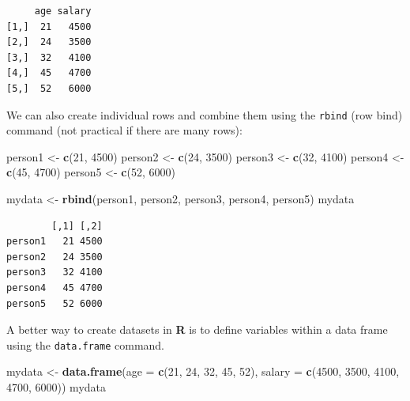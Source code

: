 \documentclass[]{book}
\newenvironment{Shaded}{\begin{snugshade}}{\end{snugshade}}
\newcommand{\DataTypeTok}[1]{\textcolor[rgb]{0.13,0.29,0.53}{#1}}
\newcommand{\DecValTok}[1]{\textcolor[rgb]{0.00,0.00,0.81}{#1}}
\newcommand{\KeywordTok}[1]{\textcolor[rgb]{0.13,0.29,0.53}{\textbf{#1}}}
\newcommand{\NormalTok}[1]{#1}
\newcommand{\StringTok}[1]{\textcolor[rgb]{0.31,0.60,0.02}{#1}}
\begin{document}
\begin{verbatim}
     age salary
[1,]  21   4500
[2,]  24   3500
[3,]  32   4100
[4,]  45   4700
[5,]  52   6000
\end{verbatim}

We can also create individual rows and combine them using the \texttt{rbind} (row bind) command (not practical if there are many rows):

\begin{Shaded}
\begin{Highlighting}[]
\NormalTok{person1 <-}\StringTok{ }\KeywordTok{c}\NormalTok{(}\DecValTok{21}\NormalTok{, }\DecValTok{4500}\NormalTok{)}
\NormalTok{person2 <-}\StringTok{ }\KeywordTok{c}\NormalTok{(}\DecValTok{24}\NormalTok{, }\DecValTok{3500}\NormalTok{)}
\NormalTok{person3 <-}\StringTok{ }\KeywordTok{c}\NormalTok{(}\DecValTok{32}\NormalTok{, }\DecValTok{4100}\NormalTok{)}
\NormalTok{person4 <-}\StringTok{ }\KeywordTok{c}\NormalTok{(}\DecValTok{45}\NormalTok{, }\DecValTok{4700}\NormalTok{)}
\NormalTok{person5 <-}\StringTok{ }\KeywordTok{c}\NormalTok{(}\DecValTok{52}\NormalTok{, }\DecValTok{6000}\NormalTok{)}

\NormalTok{mydata <-}\StringTok{ }\KeywordTok{rbind}\NormalTok{(person1, person2, person3, person4, person5)}
\NormalTok{mydata}
\end{Highlighting}
\end{Shaded}

\begin{verbatim}
        [,1] [,2]
person1   21 4500
person2   24 3500
person3   32 4100
person4   45 4700
person5   52 6000
\end{verbatim}

A better way to create datasets in \textbf{R} is to define variables within a data frame using the \texttt{data.frame} command.

\begin{Shaded}
\begin{Highlighting}[]
\NormalTok{mydata <-}\StringTok{ }\KeywordTok{data.frame}\NormalTok{(}\DataTypeTok{age =} \KeywordTok{c}\NormalTok{(}\DecValTok{21}\NormalTok{, }\DecValTok{24}\NormalTok{, }\DecValTok{32}\NormalTok{, }\DecValTok{45}\NormalTok{, }\DecValTok{52}\NormalTok{), }
                     \DataTypeTok{salary =} \KeywordTok{c}\NormalTok{(}\DecValTok{4500}\NormalTok{, }\DecValTok{3500}\NormalTok{, }\DecValTok{4100}\NormalTok{, }\DecValTok{4700}\NormalTok{, }\DecValTok{6000}\NormalTok{))}
\NormalTok{mydata}
\end{Highlighting}
\end{Shaded}
\end{document}
